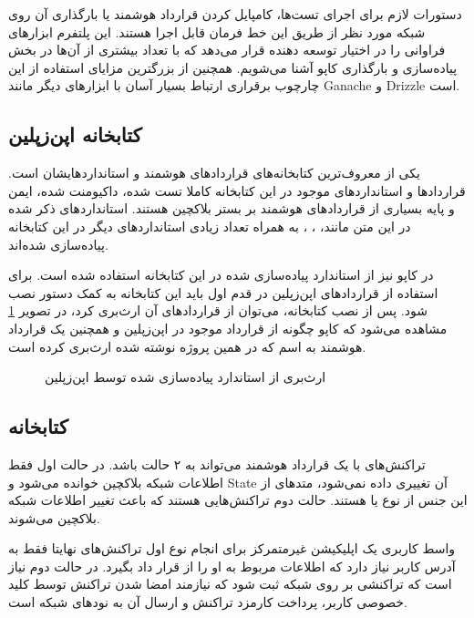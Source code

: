 دستورات لازم برای اجرای تست‌ها،
کامپایل کردن قرارداد هوشمند یا بارگذاری آن روی شبکه مورد نظر از طریق این خط فرمان قابل اجرا هستند.
این پلتفرم ابزارهای فراوانی را در اختیار توسعه دهنده قرار می‌دهد
که با تعداد بیشتری از آن‌ها در بخش پیاده‌سازی و بارگذاری کاپو آشنا می‌شویم.
همچنین از بزرگترین مزایای استفاده از این چارچوب برقراری ارتباط بسیار آسان با ابزارهای دیگر مانند
\gls{Ganache}
و
\gls{Drizzle}
است.

\subsection{کتابخانه اپن‌زپلین}
یکی از معروف‌ترین کتابخانه‌های قراردادهای هوشمند و استانداردهایشان است.
قراردادها و استانداردهای موجود در این کتابخانه
کاملا تست شده، داکیومنت شده، ایمن و پایه بسیاری از قراردادهای هوشمند بر بستر بلاکچین هستند.
استانداردهای ذکر شده در این متن مانند،
،
،
به همراه تعداد زیادی استانداردهای دیگر در این کتابخانه پیاده‌سازی شده‌اند.

در کاپو نیز از استاندارد
پیاده‌سازی شده در این کتابخانه استفاده شده است.
برای استفاده از قرارداد‌های اپن‌زپلین در قدم اول باید این کتابخانه به کمک دستور
نصب شود. پس از نصب کتابخانه، می‌توان از قراردادهای آن ارث‌بری کرد، در تصویر
\ref{fig:inherit-erc721}
مشاهده می‌شود که کاپو چگونه از قرارداد
موجود در اپن‌زپلین و همچنین یک قرارداد هوشمند به اسم
که در همین پروژه نوشته شده ارث‌بری کرده است.

\begin{figure}[H]
\centerline{}
\caption{ارث‌بری از استاندارد  پیاده‌سازی شده توسط اپن‌زپلین}
\label{fig:inherit-erc721}
\end{figure}

\subsection{کتابخانه }
تراکنش‌های با یک قرارداد هوشمند می‌تواند به ۲ حالت باشد.
در حالت اول فقط اطلاعات شبکه بلاکچین خوانده می‌شود و
\gls{State}
آن تغییری داده نمی‌شود، متدهای از این جنس از نوع
یا
هستند. حالت دوم تراکنش‌هایی هستند که باعث تغییر اطلاعات شبکه بلاکچین می‌شوند.

واسط کاربری یک اپلیکیشن غیرمتمرکز برای انجام نوع اول تراکنش‌های نهایتا فقط به آدرس کاربر نیاز دارد
که اطلاعات مربوط به او را از قرار داد بگیرد.
در حالت دوم نیاز است که تراکنشی بر روی شبکه ثبت شود که نیازمند امضا شدن تراکنش توسط کلید خصوصی کاربر،
پرداخت کارمزد تراکنش و ارسال آن به نودهای شبکه است.

